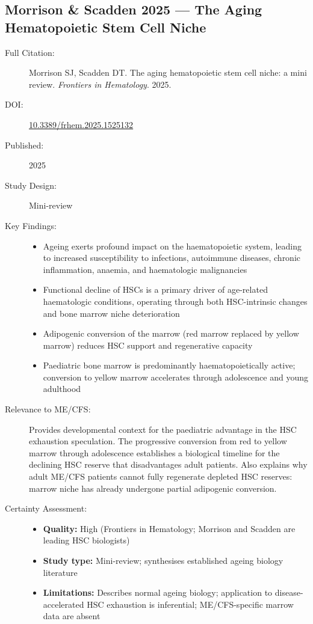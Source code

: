 \subsection{Morrison \& Scadden 2025 --- The Aging Hematopoietic Stem Cell Niche}

\begin{description}
    \item[Full Citation:] Morrison SJ, Scadden DT. The aging hematopoietic stem cell niche: a mini review. \textit{Frontiers in Hematology}. 2025.
    \item[DOI:] \href{https://doi.org/10.3389/frhem.2025.1525132}{10.3389/frhem.2025.1525132}
    \item[Published:] 2025
    \item[Study Design:] Mini-review
    \item[Key Findings:]
    \begin{itemize}
        \item Ageing exerts profound impact on the haematopoietic system, leading to increased susceptibility to infections, autoimmune diseases, chronic inflammation, anaemia, and haematologic malignancies
        \item Functional decline of HSCs is a primary driver of age-related haematologic conditions, operating through both HSC-intrinsic changes and bone marrow niche deterioration
        \item Adipogenic conversion of the marrow (red marrow replaced by yellow marrow) reduces HSC support and regenerative capacity
        \item Paediatric bone marrow is predominantly haematopoietically active; conversion to yellow marrow accelerates through adolescence and young adulthood
    \end{itemize}
    \item[Relevance to ME/CFS:] Provides developmental context for the paediatric advantage in the HSC exhaustion speculation. The progressive conversion from red to yellow marrow through adolescence establishes a biological timeline for the declining HSC reserve that disadvantages adult patients. Also explains why adult ME/CFS patients cannot fully regenerate depleted HSC reserves: marrow niche has already undergone partial adipogenic conversion.
    \item[Certainty Assessment:]
    \begin{itemize}
        \item \textbf{Quality:} High (Frontiers in Hematology; Morrison and Scadden are leading HSC biologists)
        \item \textbf{Study type:} Mini-review; synthesises established ageing biology literature
        \item \textbf{Limitations:} Describes normal ageing biology; application to disease-accelerated HSC exhaustion is inferential; ME/CFS-specific marrow data are absent
    \end{itemize}
\end{description}

